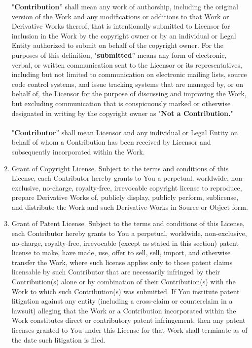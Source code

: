 \begin{enumerate}
"\textbf{Contribution}'' shall mean any work of authorship, including the original version of the Work and any modifications or additions to that Work or Derivative Works thereof, that is intentionally submitted to Licensor for inclusion in the Work by the copyright owner or by an individual or Legal Entity authorized to submit on behalf of the copyright owner. For the purposes of this definition, "\textbf{submitted}'' means any form of electronic, verbal, or written communication sent to the Licensor or its representatives, including but not limited to communication on electronic mailing lists, source code control systems, and issue tracking systems that are managed by, or on behalf of, the Licensor for the purpose of discussing and improving the Work, but excluding communication that is conspicuously marked or otherwise designated in writing by the copyright owner as "\textbf{Not a Contribution.}"\\\\
"\textbf{Contributor}'' shall mean Licensor and any individual or Legal Entity on behalf of whom a Contribution has been received by Licensor and subsequently incorporated within the Work.\\
\item Grant of Copyright License. Subject to the terms and conditions of this License, each Contributor hereby grants to You a perpetual, worldwide, non-exclusive, no-charge, royalty-free, irrevocable copyright license to reproduce, prepare Derivative Works of, publicly display, publicly perform, sublicense, and distribute the Work and such Derivative Works in Source or Object form.\\
\item Grant of Patent License. Subject to the terms and conditions of this License, each Contributor hereby grants to You a perpetual, worldwide, non-exclusive, no-charge, royalty-free, irrevocable (except as stated in this section) patent license to make, have made, use, offer to sell, sell, import, and otherwise transfer the Work, where such license applies only to those patent claims licensable by such Contributor that are necessarily infringed by their Contribution(s) alone or by combination of their Contribution(s) with the Work to which such Contribution(s) was submitted. If You institute patent litigation against any entity (including a cross-claim or counterclaim in a lawsuit) alleging that the Work or a Contribution incorporated within the Work constitutes direct or contributory patent infringement, then any patent licenses granted to You under this License for that Work shall terminate as of the date such litigation is filed.\\

\end{enumerate}

